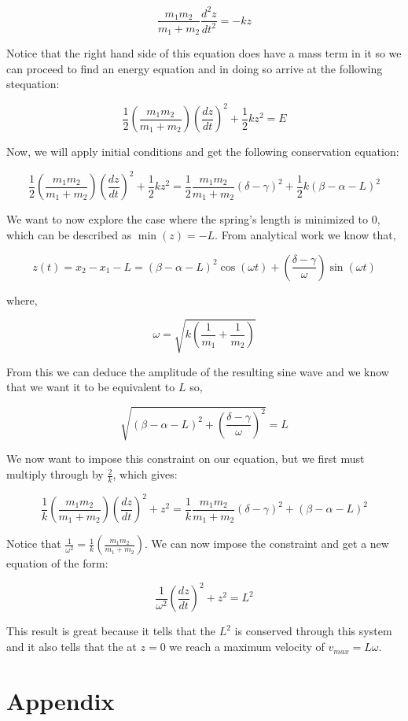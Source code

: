 \documentclass[11pt, oneside]{article}   	%
\begin{document}
$$\frac{m_1m_2}{m_1+m_2}\frac{d^2z}{dt^2}=-kz$$

Notice that the right hand side of this equation does have a mass term in it so we can proceed to find an energy equation and in doing so arrive at the following stequation:

$$\frac{1}{2}\left(\frac{m_1m_2}{m_1+m_2}\right)\left(\frac{dz}{dt}\right)^2 +\frac{1}{2}kz^2=E$$

Now, we will apply initial conditions and get the following conservation equation:

$$\frac{1}{2}\left(\frac{m_1m_2}{m_1+m_2}\right)\left(\frac{dz}{dt}\right)^2 +\frac{1}{2}kz^2=\frac{1}{2}\frac{m_1m_2}{m_1+m_2}\left(\delta -\gamma\right)^2+\frac{1}{2}k\left(\beta -\alpha -L\right)^2$$

We want to now explore the case where the spring's length is minimized to 0, which can be described as $\min(z)=-L$.
From analytical work we know that,

$$\displaystyle{z(t)=x_2-x_1-L=(\beta -\alpha -L)^2\cos{(\omega t)}+\left(\frac{\delta -\gamma}{\omega}\right)\sin{(\omega t)}}$$

where, 

$$\displaystyle{\omega = \sqrt{k\left(\frac{1}{m_1}+\frac{1}{m_2}\right)}}$$

From this we can deduce the amplitude of the resulting sine wave and we know that we want it to be equivalent to $L$ so,

$$\sqrt{(\beta -\alpha -L)^2+\left(\frac{\delta - \gamma}{\omega}\right)^2}=L$$

We now want to impose this constraint on our equation, but we first must multiply through by $\frac{2}{k}$, which gives:

$$\frac{1}{k}\left(\frac{m_1m_2}{m_1+m_2}\right)\left(\frac{dz}{dt}\right)^2 +z^2=\frac{1}{k}\frac{m_1m_2}{m_1+m_2}\left(\delta -\gamma\right)^2+\left(\beta -\alpha -L\right)^2$$

Notice that $\displaystyle{\frac{1}{\omega^2}}=\frac{1}{k}\left(\frac{m_1m_2}{m_1+m_2}\right)$. We can now impose the constraint and get a new equation of the form:

$$\frac{1}{\omega^2}\left(\frac{dz}{dt}\right)^2+z^2=L^2$$

This result is great because it tells that the $L^2$ is conserved through this system and it also tells that the at $z=0$ we reach a maximum velocity of $v_{max}=L\omega$.
\section{Appendix}
\end{document}
